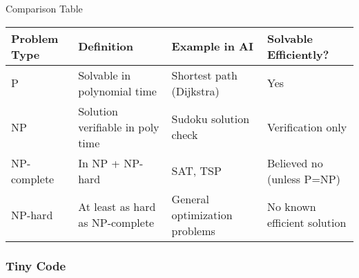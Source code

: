 \documentclass[
  letterpaper,
  DIV=11,
  numbers=noendperiod]{scrreprt}
\begin{document}
Comparison Table

\begin{longtable}[]{@{}
  >{\raggedright\arraybackslash}p{}
  >{\raggedright\arraybackslash}p{}
  >{\raggedright\arraybackslash}p{}
  >{\raggedright\arraybackslash}p{}@{}}
\toprule\noalign{}
\begin{minipage}[b]{\linewidth}\raggedright
Problem Type
\end{minipage} & \begin{minipage}[b]{\linewidth}\raggedright
Definition
\end{minipage} & \begin{minipage}[b]{\linewidth}\raggedright
Example in AI
\end{minipage} & \begin{minipage}[b]{\linewidth}\raggedright
Solvable Efficiently?
\end{minipage} \\
\midrule\noalign{}
\endhead
\bottomrule\noalign{}
\endlastfoot
P & Solvable in polynomial time & Shortest path (Dijkstra) & Yes \\
NP & Solution verifiable in poly time & Sudoku solution check &
Verification only \\
NP-complete & In NP + NP-hard & SAT, TSP & Believed no (unless P=NP) \\
NP-hard & At least as hard as NP-complete & General optimization
problems & No known efficient solution \\
\end{longtable}

\subsubsection{Tiny Code}\label{tiny-code-34}
\end{document}
